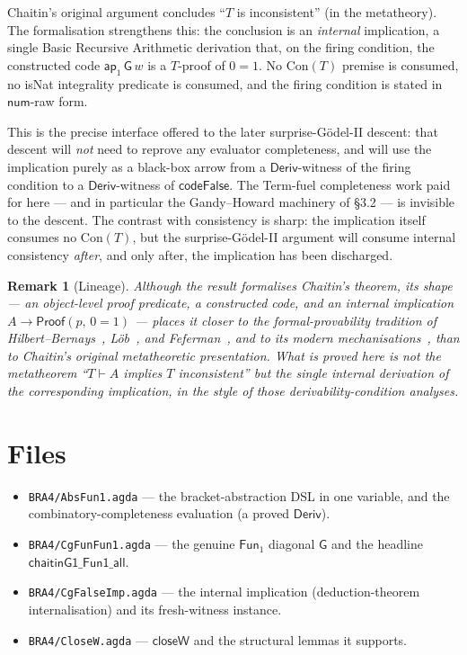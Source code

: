 \documentclass[11pt]{article}
\newtheorem{remark}{Remark}
\newcommand{\Deriv}{\mathsf{Deriv}}
\newcommand{\closeW}{\mathsf{closeW}}
\newcommand{\codeFalse}{\mathsf{codeFalse}}
\newcommand{\num}{\mathsf{num}}
\newcommand{\ap}[1]{\mathsf{ap}_{#1}}
\newcommand{\Fun}[1]{\mathsf{Fun}_{#1}}
\newcommand{\GG}{\mathsf{G}}
\begin{document}
Chaitin's original argument concludes ``$T$ is inconsistent'' (in the
metatheory). The formalisation strengthens this: the conclusion is
an \emph{internal} implication, a single Basic Recursive Arithmetic derivation that, on the
firing condition, the constructed code $\ap{1}\,\GG\,w$ is a $T$-proof
of $0=1$. No $\mathrm{Con}(T)$ premise is consumed, no \textsf{isNat}
integrality predicate is consumed, and the firing condition is stated
in $\num$-raw form.

This is the precise interface offered to the later surprise-G\"odel-II
descent: that descent will \emph{not} need to reprove any evaluator
completeness, and will use the implication purely as a black-box arrow
from a $\Deriv$-witness of the firing condition to a $\Deriv$-witness of
$\codeFalse$. The Term-fuel completeness work paid for here --- and in
particular the Gandy--Howard machinery of \S3.2 --- is invisible to the
descent. The contrast with consistency is sharp: the implication itself
consumes no $\mathrm{Con}(T)$, but the surprise-G\"odel-II argument will
consume internal consistency \emph{after}, and only after, the
implication has been discharged.

\begin{remark}[Lineage]
Although the result formalises Chaitin's theorem, its \emph{shape} ---
an object-level proof predicate, a constructed code, and an internal
implication $A \to \mathsf{Proof}(p,\,0=1)$ --- places it closer to the
formal-provability tradition of Hilbert--Bernays~\cite{HilbertBernays},
L\"ob~\cite{Loeb}, and Feferman~\cite{Feferman}, and to its modern
mechanisations~\cite{Paulson}, than to Chaitin's original metatheoretic
presentation. What is proved here is not the metatheorem ``$T \vdash A$
implies $T$ inconsistent'' but the single internal derivation of the
corresponding implication, in the style of those derivability-condition
analyses.
\end{remark}

\section{Files}

\begin{itemize}
\item \texttt{BRA4/AbsFun1.agda} --- the bracket-abstraction DSL in one
  variable, and the combinatory-completeness evaluation (a proved $\Deriv$).
\item \texttt{BRA4/CgFunFun1.agda} --- the genuine $\Fun{1}$ diagonal
  $\GG$ and the headline $\textsf{chaitinG1\_Fun1\_all}$.
\item \texttt{BRA4/CgFalseImp.agda} --- the internal implication
  (deduction-theorem internalisation) and its fresh-witness instance.
\item \texttt{BRA4/CloseW.agda} --- $\closeW$ and the structural lemmas
  it supports.
\end{itemize}
\end{document}
